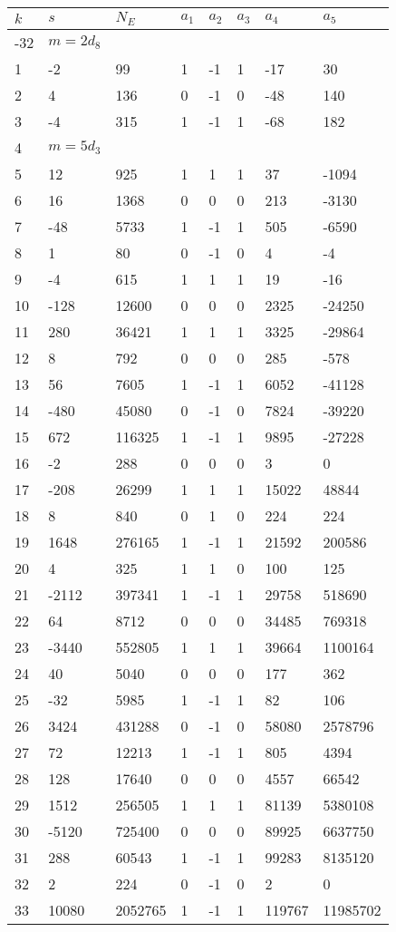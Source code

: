 \documentclass{amsart}
\begin{document}
\begin{longtable}{|l|l|l|lllll|}
\hline
$k$ & $s$ & $N_E$ & $a_1$ & $a_2$ & $a_3$ & $a_4$ & $a_5$\\
\hline
-32&$m=2d_{8}$&&\multicolumn{5}{c|}{}\\
1&-2&99&1&-1&1&-17&30\\
2&4&136&0&-1&0&-48&140\\
3&-4&315&1&-1&1&-68&182\\
4&$m=5d_{3}$&&\multicolumn{5}{c|}{}\\
5&12&925&1&1&1&37&-1094\\
6&16&1368&0&0&0&213&-3130\\
7&-48&5733&1&-1&1&505&-6590\\
8&1&80&0&-1&0&4&-4\\
9&-4&615&1&1&1&19&-16\\
10&-128&12600&0&0&0&2325&-24250\\
11&280&36421&1&1&1&3325&-29864\\
12&8&792&0&0&0&285&-578\\
13&56&7605&1&-1&1&6052&-41128\\
14&-480&45080&0&-1&0&7824&-39220\\
15&672&116325&1&-1&1&9895&-27228\\
16&-2&288&0&0&0&3&0\\
17&-208&26299&1&1&1&15022&48844\\
18&8&840&0&1&0&224&224\\
19&1648&276165&1&-1&1&21592&200586\\
20&4&325&1&1&0&100&125\\
21&-2112&397341&1&-1&1&29758&518690\\
22&64&8712&0&0&0&34485&769318\\
23&-3440&552805&1&1&1&39664&1100164\\
24&40&5040&0&0&0&177&362\\
25&-32&5985&1&-1&1&82&106\\
26&3424&431288&0&-1&0&58080&2578796\\
27&72&12213&1&-1&1&805&4394\\
28&128&17640&0&0&0&4557&66542\\
29&1512&256505&1&1&1&81139&5380108\\
30&-5120&725400&0&0&0&89925&6637750\\
31&288&60543&1&-1&1&99283&8135120\\
32&2&224&0&-1&0&2&0\\
33&10080&2052765&1&-1&1&119767&11985702\\

\end{longtable}
\end{document}
